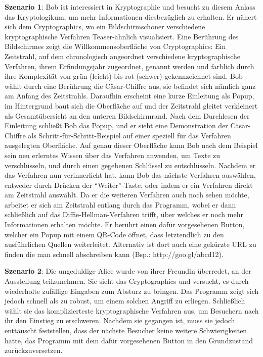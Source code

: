 \documentclass{article}
\begin{document}
\textbf{Szenario 1}:
Bob ist interessiert in Kryptographie und besucht zu diesem Anlass das Kryptologikum, um mehr Informationen diesbezüglich zu erhalten. Er nähert sich dem Cryptographics, wo ein Bildschirmschoner verschiedene kryptographische Verfahren Teaser-ähnlich visualisiert. Eine Berührung des Bildschirmes zeigt die Willkommensoberfläche von Cryptographics: Ein Zeitstrahl, auf dem chronologisch angeordnet verschiedene kryptographische Verfahren, ihrem Erfindungsjahr zugeordnet, genannt werden und farblich durch ihre Komplexität von grün (leicht) bis rot (schwer) gekennzeichnet sind. Bob wählt durch eine Berührung die Cäsar-Chiffre aus, sie befindet sich nämlich ganz am Anfang des Zeitstrahls. Daraufhin erscheint eine kurze Einleitung als Popup, im Hintergrund baut sich die Oberfläche auf und der Zeitstrahl gleitet verkleinert als Gesamtübersicht an den unteren Bildschirmrand. Nach dem Durchlesen der Einleitung schließt Bob das Popup, und er sieht eine Demonstration der Cäsar-Chiffre als Schritt-für-Schritt-Beispiel auf einer speziell für das Verfahren ausgelegten Oberfläche. Auf genau dieser Oberfläche kann Bob nach dem Beispiel sein neu erlerntes Wissen über das Verfahren anwenden, um Texte zu verschlüsseln, und durch einen gegebenen Schlüssel zu entschlüsseln. Nachdem er das Verfahren nun verinnerlicht hat, kann Bob das nächste Verfahren auswählen, entweder durch Drücken der “Weiter”-Taste, oder indem er ein Verfahren direkt am Zeitstrahl auswählt. Da er die weiteren Verfahren auch noch sehen möchte, arbeitet er sich am Zeitstrahl entlang durch das Programm, wobei er dann schließlich auf das Diffie-Hellman-Verfahren trifft, über welches er noch mehr Informationen erhalten möchte. Er berührt einen dafür vorgesehenen Button, welcher ein Popup mit einem QR-Code öffnet, dass letztendlich zu den ausführlichen Quellen weiterleitet. Alternativ ist dort auch eine gekürzte URL zu finden die man schnell abschreiben kann (Bsp.: http://goo.gl/abcd12).

\textbf{Szenario 2}:
Die ungeduldige Alice wurde von ihrer Freundin überredet, an der Ausstellung teilzunehmen. Sie sieht das Cryptographics und versucht, es durch wiederholte zufällige Eingaben zum Absturz zu bringen. Das Programm zeigt sich jedoch schnell als zu robust, um einem solchen Angriff zu erliegen. Schließlich wählt sie das komplizierteste kryptographische Verfahren aus, um Besuchern nach ihr den Einstieg zu erschweren. Nachdem sie gegangen ist, muss sie jedoch enttäuscht feststellen, dass der nächste Besucher keine weitere Schwierigkeiten hatte, das Programm mit dem dafür vorgesehenen Button in den Grundzustand zurückzuversetzen.
\end{document}
